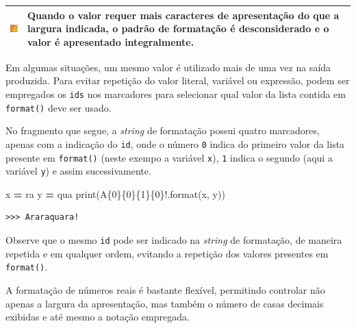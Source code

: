 \documentclass[
]{book}
\newenvironment{Shaded}{\begin{snugshade}}{\end{snugshade}}
\newcommand{\BuiltInTok}[1]{#1}
\newcommand{\NormalTok}[1]{#1}
\newcommand{\OperatorTok}[1]{\textcolor[rgb]{0.81,0.36,0.00}{\textbf{#1}}}
\newcommand{\SpecialCharTok}[1]{\textcolor[rgb]{0.00,0.00,0.00}{#1}}
\newcommand{\StringTok}[1]{\textcolor[rgb]{0.31,0.60,0.02}{#1}}
\begin{document}
\begin{longtable}[]{@{}
  >{\centering\arraybackslash}p{}
  >{\raggedright\arraybackslash}p{}@{}}
\toprule
\includegraphics{images/warn.png} & Quando o valor requer mais caracteres de apresentação do que a largura indicada, o padrão de formatação é desconsiderado e o valor é apresentado integralmente. \\
\midrule
\endhead
\bottomrule
\end{longtable}

Em algumas situações, um mesmo valor é utilizado mais de uma vez na saída produzida. Para evitar repetição do valor literal, variável ou expressão, podem ser empregados os \texttt{ids} nos marcadores para selecionar qual valor da lista contida em \texttt{format()} deve ser usado.

No fragmento que segue, a \emph{string} de formatação possui quatro marcadores, apenas com a indicação do \texttt{id}, onde o número \texttt{0} indica do primeiro valor da lista presente em \texttt{format()} (neste exempo a variável \texttt{x}), \texttt{1} indica o segundo (aqui a variável \texttt{y}) e assim sucessivamente.

\begin{Shaded}
\begin{Highlighting}[]
\NormalTok{x }\OperatorTok{=} \StringTok{\textquotesingle{}ra\textquotesingle{}}
\NormalTok{y }\OperatorTok{=} \StringTok{\textquotesingle{}qua\textquotesingle{}}
\BuiltInTok{print}\NormalTok{(}\StringTok{\textquotesingle{}A}\SpecialCharTok{\{0\}\{0\}\{1\}\{0\}}\StringTok{!\textquotesingle{}}\NormalTok{.}\BuiltInTok{format}\NormalTok{(x, y))}
\end{Highlighting}
\end{Shaded}

\begin{verbatim}
>>> Araraquara!
\end{verbatim}

Observe que o mesmo \texttt{id} pode ser indicado na \emph{string} de formatação, de maneira repetida e em qualquer ordem, evitando a repetição dos valores presentes em \texttt{format()}.

A formatação de números reais é bastante flexível, permitindo controlar não apenas a largura da apresentação, mas também o número de casas decimais exibidas e até mesmo a notação empregada.
\end{document}
